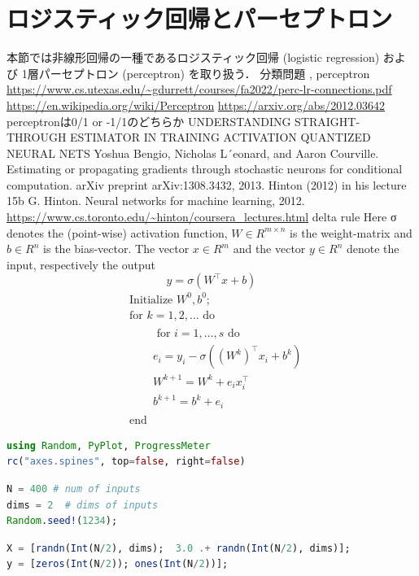 \section{ロジスティック回帰とパーセプトロン}
本節では非線形回帰の一種であるロジスティック回帰 (logistic regression) および 1層パーセプトロン (perceptron) を取り扱う．
分類問題
, perceptron
\url{https://www.cs.utexas.edu/~gdurrett/courses/fa2022/perc-lr-connections.pdf}
\url{https://en.wikipedia.org/wiki/Perceptron}
\url{https://arxiv.org/abs/2012.03642}
perceptronは0/1 or -1/1のどちらか
UNDERSTANDING STRAIGHT-THROUGH ESTIMATOR IN TRAINING ACTIVATION QUANTIZED NEURAL NETS
Yoshua Bengio, Nicholas L´eonard, and Aaron Courville. Estimating or propagating gradients through stochastic neurons for conditional computation. arXiv preprint arXiv:1308.3432, 2013.
Hinton (2012) in his lecture 15b
G. Hinton. Neural networks for machine learning, 2012.
\url{https://www.cs.toronto.edu/~hinton/coursera_lectures.html}
delta rule
Here σ denotes the (point-wise) activation function, $W \in R^{m\times n}$
is the weight-matrix and $b \in R^n$
is
the bias-vector. The vector $x \in R^m$ and the vector $y \in R^n$ denote the input, respectively the output
\begin{equation}
y=\sigma(W^\top x + b)
\end{equation}
\begin{align}
& \text { Initialize } W^0, b^0 \text {; } \\
& \text { for } k=1,2, \ldots \text { do } \\
& \qquad \begin{array}{|l}
\text { for } i=1, \ldots, s \text { do } \\
e_i=y_i-\sigma\left(\left(W^k\right)^{\top} x_i+b^k\right) \\
W^{k+1}=W^k+e_i x_i^{\top} \\
b^{k+1}=b^k+e_i
\end{array} \\
& \text { end }
\end{align}
\begin{lstlisting}[language=julia]
using Random, PyPlot, ProgressMeter
rc("axes.spines", top=false, right=false)
\end{lstlisting}
\begin{lstlisting}[language=julia]
N = 400 # num of inputs
dims = 2  # dims of inputs 
Random.seed!(1234);
\end{lstlisting}
\begin{lstlisting}[language=julia]
X = [randn(Int(N/2), dims);  3.0 .+ randn(Int(N/2), dims)];
y = [zeros(Int(N/2)); ones(Int(N/2))];
\end{lstlisting}
